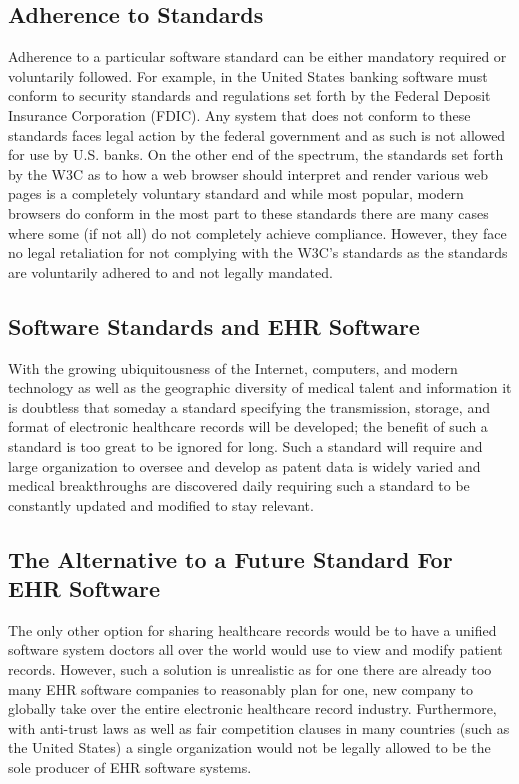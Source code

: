 \documentclass[14pt]{article}
\begin{document}
\subsection{Adherence to Standards}
Adherence to a particular software standard can be either mandatory required or voluntarily followed. For example, in the United States banking software must conform to security standards and regulations set forth by the Federal Deposit Insurance Corporation (FDIC). Any system that does not conform to these standards faces legal action by the federal government and as such is not allowed for use by U.S. banks. On the other end of the spectrum, the standards set forth by the W3C as to how a web browser should interpret and render various web pages is a completely voluntary standard and while most popular, modern browsers do conform in the most part to these standards there are many cases where some (if not all) do not completely achieve compliance. However, they face no legal retaliation for not complying with the W3C's standards as the standards are voluntarily adhered to and not legally mandated.


\subsection{Software Standards and EHR Software}
With the growing ubiquitousness of the Internet, computers, and modern technology as well as the geographic diversity of medical talent and information it is doubtless that someday a standard specifying the transmission, storage, and format of electronic healthcare records will be developed; the benefit of such a standard is too great to be ignored for long. Such a standard will require and large organization to oversee and develop as patent data is widely varied and medical breakthroughs are discovered daily requiring such a standard to be constantly updated and modified to stay relevant. 

\subsection{The Alternative to a Future Standard For EHR Software}
The only other option for sharing healthcare records would be to have a unified software system doctors all over the world would use to view and modify patient records. However, such a solution is unrealistic as for one there are already too many \gls{EHR} software companies to reasonably plan for one, new company to globally take over the entire electronic healthcare record industry. Furthermore, with anti-trust laws as well as fair competition clauses in many countries (such as the United States) a single organization would not be legally allowed to be the sole producer of \gls{EHR} software systems.
\end{document}
